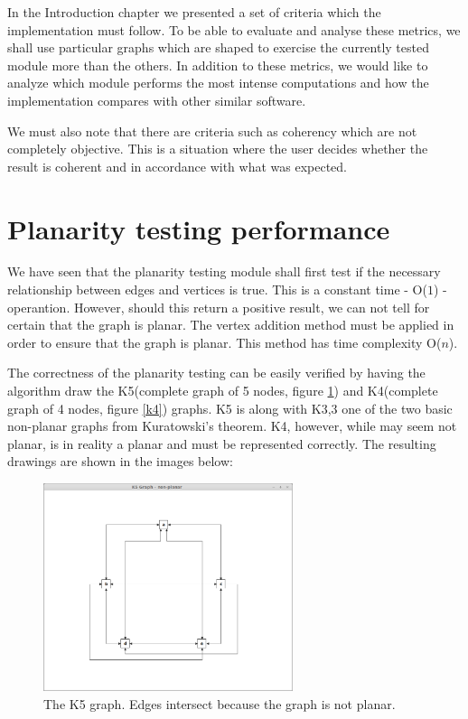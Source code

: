 In the Introduction chapter we presented a set of criteria which the implementation must follow.
To be able to evaluate and analyse these metrics, we shall use particular graphs which are shaped to exercise 
the currently tested module more than the others. In addition to these metrics, we would like to analyze 
which module performs the most intense computations and how the implementation compares with other 
similar software.

We must also note that there are criteria such as coherency which are not completely objective. This is a 
situation where the user decides whether the result is coherent and in accordance with what was expected.

\section{Planarity testing performance}

We have seen that the planarity testing module shall first test if the necessary relationship between 
edges and vertices is true. This is a constant time - O(${1}$) - operantion. However, should this 
return a positive result, we can not tell for certain that the graph is planar. The vertex addition method 
must be applied in order to ensure that the graph is planar. This method has time complexity O(${n}$).

The correctness of the planarity testing can be easily verified by having the algorithm draw the K5(complete 
graph of 5 nodes, figure \ref{k5}) and K4(complete graph of 4 nodes, figure \ref {k4}) graphs. K5 is along with K3,3 one of the two basic 
non-planar graphs from Kuratowski's theorem. K4, however, while may seem not planar, is in reality a planar 
and must be represented correctly. The resulting drawings are shown in the images below:

\begin{figure}[ht] \centering
\includegraphics[width=0.65\textwidth]{img/results/k5graph.png}
\caption{The K5 graph. Edges intersect because the graph is not planar. \label{k5}} \end{figure}

